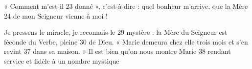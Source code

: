 « Comment m'est-il	 
23	 	donné », c'est-à-dire : quel bonheur m'arrive, que la Mère	 
24	 	de mon Seigneur vienne à moi !

Je pressens le miracle, je reconnais le	 
29	 	mystère : la Mère du Seigneur est féconde du Verbe, pleine	 
30	 	de Dieu.
« Marie demeura chez elle trois mois et s'en revint	 
37	 	dans sa maison. » Il est bien qu'on nous montre Marie	 
38	 	rendant service et fidèle à un nombre mystique